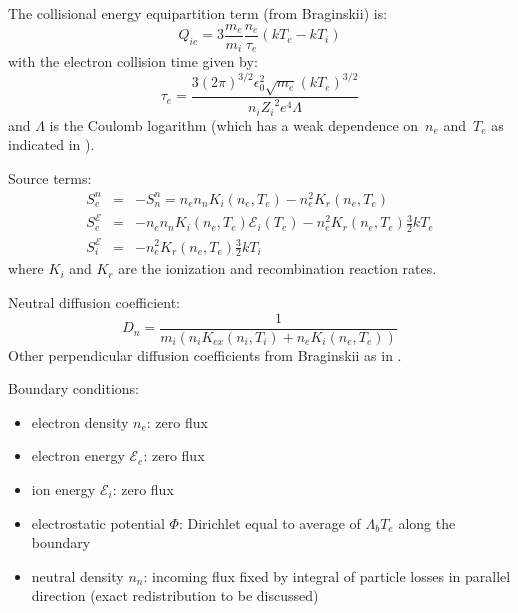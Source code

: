 The collisional energy equipartition term (from Braginskii) is:
\begin{equation}
Q_{ie} = 3 {\frac{m_e}{m_i}} \frac{n_e}{\tau_e} \left( kT_e - kT_i \right)
\end{equation}
with the electron collision time given by: 
\begin{equation}
\tau_e = \frac{3 \left(2 
\pi \right)^{3/2} \epsilon_0^2 \sqrt{m_e} (kT_e)^{3/2}}{n_i 
{Z_i}^2 e^4 \Lambda}
\end{equation}
and $\Lambda$ is the Coulomb 
logarithm (which has a weak dependence on~$n_e$ and~$T_e$ as indicated in ).

Source terms:
\begin{eqnarray}
S^n_{e} & = & -S^n_{n} = n_e n_n K_i \left( n_e, T_e \right) - n_e^2 
K_r \left( n_e, T_e \right) \\
S^{\mathcal{E}}_{e} & = &  - n_e n_n K_i \left( n_e, T_e \right) \mathcal{E}_i 
\left( T_e \right) - n_e^2 K_r \left( n_e, T_e \right) \frac{3}{2} kT_e 
\\
S^{\mathcal{E}}_{i} & = &  - n_e^2 K_r \left( n_e, T_e \right) \frac{3}{2} kT_i
\end{eqnarray}
where $K_i$ and $K_r$ are the ionization and recombination reaction rates.

Neutral diffusion coefficient:
\begin{equation}
D_n = \frac{1}{m_i \left( n_i K_{cx} ( n_i, T_i ) + n_e K_i ( n_e, T_e ) \right)}
\end{equation}
Other perpendicular diffusion coefficients from Braginskii as
in .

Boundary conditions:
\begin{itemize}
\item electron density $n_e$: zero flux
\item electron energy $\mathcal{E}_e$: zero flux
\item ion energy $\mathcal{E}_i$: zero flux
\item electrostatic potential $\Phi$: Dirichlet equal to 
average of $\Lambda_b T_e$ along the boundary
\item neutral density $n_n$: incoming flux fixed by integral of 
particle losses in parallel direction (exact redistribution to be 
discussed)
\end{itemize}

